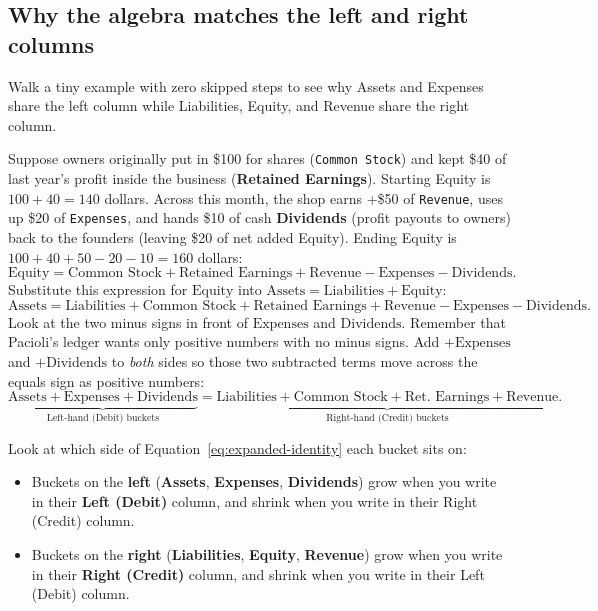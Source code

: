 \subsection*{Why the algebra matches the left and right columns}

Walk a tiny example with zero skipped steps to see why Assets and Expenses share the left column while Liabilities, Equity, and Revenue share the right column.

Suppose owners originally put in \$100 for shares (\texttt{Common Stock}) and kept \$40 of last year's profit inside the business (\textbf{Retained Earnings}). Starting Equity is $100 + 40 = 140$ dollars. Across this month, the shop earns +\$50 of \texttt{Revenue}, uses up \$20 of \texttt{Expenses}, and hands \$10 of cash \textbf{Dividends} (profit payouts to owners) back to the founders (leaving \$20 of net added Equity). Ending Equity is $100 + 40 + 50 - 20 - 10 = 160$ dollars:
\[
  \text{Equity} = \text{Common Stock} + \text{Retained Earnings} + \text{Revenue} - \text{Expenses} - \text{Dividends}.
\]
Substitute this expression for $\text{Equity}$ into $\text{Assets} = \text{Liabilities} + \text{Equity}$:
\[
  \text{Assets} = \text{Liabilities} + \text{Common Stock} + \text{Retained Earnings} + \text{Revenue} - \text{Expenses} - \text{Dividends}.
\]
Look at the two minus signs in front of $\text{Expenses}$ and $\text{Dividends}$. Remember that Pacioli's ledger wants only positive numbers with no minus signs. Add $+\text{Expenses}$ and $+\text{Dividends}$ to \emph{both} sides so those two subtracted terms move across the equals sign as positive numbers:
\begin{equation}
  \label{eq:expanded-identity}
  \underbrace{\text{Assets} + \text{Expenses} + \text{Dividends}}_{\text{Left-hand (Debit) buckets}}
  =
  \underbrace{\text{Liabilities} + \text{Common Stock} + \text{Ret.\ Earnings} + \text{Revenue}}_{\text{Right-hand (Credit) buckets}}.
\end{equation}

Look at which side of Equation~\eqref{eq:expanded-identity} each bucket sits on:
\begin{itemize}
  \item Buckets on the \textbf{left} (\textbf{Assets}, \textbf{Expenses}, \textbf{Dividends}) grow when you write in their \textbf{Left (Debit)} column, and shrink when you write in their Right (Credit) column.
  \item Buckets on the \textbf{right} (\textbf{Liabilities}, \textbf{Equity}, \textbf{Revenue}) grow when you write in their \textbf{Right (Credit)} column, and shrink when you write in their Left (Debit) column.
\end{itemize}


